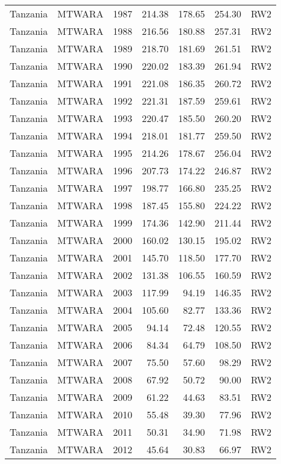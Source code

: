 \begin{longtable}{lllrrrl}
  Tanzania & MTWARA & 1987 & 214.38 & 178.65 & 254.30 & RW2 \\ 
  Tanzania & MTWARA & 1988 & 216.56 & 180.88 & 257.31 & RW2 \\ 
  Tanzania & MTWARA & 1989 & 218.70 & 181.69 & 261.51 & RW2 \\ 
  Tanzania & MTWARA & 1990 & 220.02 & 183.39 & 261.94 & RW2 \\ 
  Tanzania & MTWARA & 1991 & 221.08 & 186.35 & 260.72 & RW2 \\ 
  Tanzania & MTWARA & 1992 & 221.31 & 187.59 & 259.61 & RW2 \\ 
  Tanzania & MTWARA & 1993 & 220.47 & 185.50 & 260.20 & RW2 \\ 
  Tanzania & MTWARA & 1994 & 218.01 & 181.77 & 259.50 & RW2 \\ 
  Tanzania & MTWARA & 1995 & 214.26 & 178.67 & 256.04 & RW2 \\ 
  Tanzania & MTWARA & 1996 & 207.73 & 174.22 & 246.87 & RW2 \\ 
  Tanzania & MTWARA & 1997 & 198.77 & 166.80 & 235.25 & RW2 \\ 
  Tanzania & MTWARA & 1998 & 187.45 & 155.80 & 224.22 & RW2 \\ 
  Tanzania & MTWARA & 1999 & 174.36 & 142.90 & 211.44 & RW2 \\ 
  Tanzania & MTWARA & 2000 & 160.02 & 130.15 & 195.02 & RW2 \\ 
  Tanzania & MTWARA & 2001 & 145.70 & 118.50 & 177.70 & RW2 \\ 
  Tanzania & MTWARA & 2002 & 131.38 & 106.55 & 160.59 & RW2 \\ 
  Tanzania & MTWARA & 2003 & 117.99 & 94.19 & 146.35 & RW2 \\ 
  Tanzania & MTWARA & 2004 & 105.60 & 82.77 & 133.36 & RW2 \\ 
  Tanzania & MTWARA & 2005 & 94.14 & 72.48 & 120.55 & RW2 \\ 
  Tanzania & MTWARA & 2006 & 84.34 & 64.79 & 108.50 & RW2 \\ 
  Tanzania & MTWARA & 2007 & 75.50 & 57.60 & 98.29 & RW2 \\ 
  Tanzania & MTWARA & 2008 & 67.92 & 50.72 & 90.00 & RW2 \\ 
  Tanzania & MTWARA & 2009 & 61.22 & 44.63 & 83.51 & RW2 \\ 
  Tanzania & MTWARA & 2010 & 55.48 & 39.30 & 77.96 & RW2 \\ 
  Tanzania & MTWARA & 2011 & 50.31 & 34.90 & 71.98 & RW2 \\ 
  Tanzania & MTWARA & 2012 & 45.64 & 30.83 & 66.97 & RW2 \\ 

\end{longtable}
